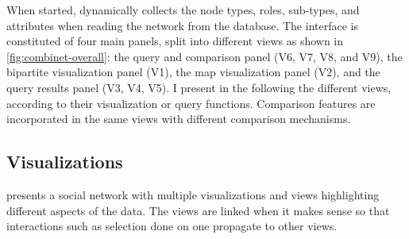 \begin{table}[!ht]
\centering
{}
    \caption{Comparison of the data model of several VA systems aimed at exploring bipartite social networks.
    }\label{tab:combinet-VA-comparison}
\end{table}


When started, \name dynamically collects the node types, roles, sub-types, and attributes when reading the network from the database. The interface is constituted of four main panels, split into different views as shown in \autoref{fig:combinet-overall}: the query and comparison panel (V6, V7, V8, and V9), the bipartite visualization panel (V1), the map visualization panel (V2), and the query results panel (V3, V4, V5).
I present in the following the different views, according to their visualization or query functions.
Comparison features are incorporated in the same views with different comparison mechanisms.


\subsection{Visualizations}

\name presents a social network with multiple visualizations and views highlighting different aspects of the data.
The views are linked when it makes sense so that interactions such as selection done on one propagate to other views.

